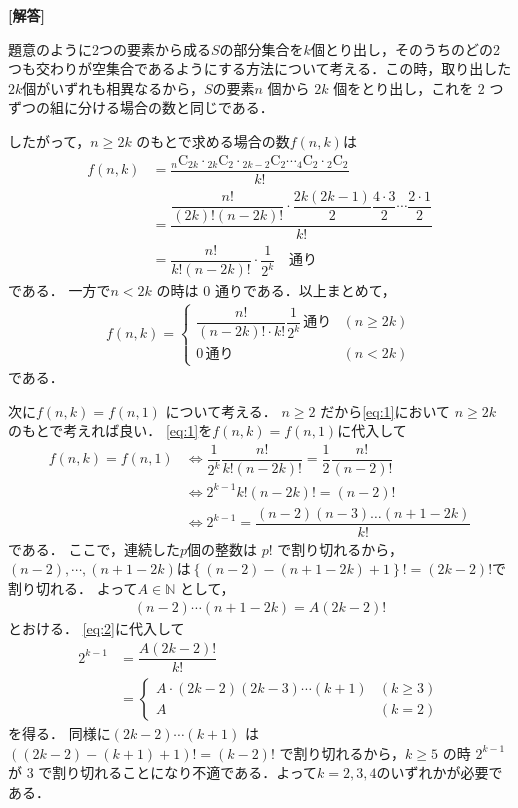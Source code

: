 \documentclass[../../main.tex]{subfiles}
\begin{document}
\begin{oframed}
  
\end{oframed}

{\bf [解答]}

題意のように2つの要素から成る$S$の部分集合を$k$個とり出し，そのうちのどの2つも交わりが空集合であるようにする方法について考える．この時，取り出した$2k$個がいずれも相異なるから，$S$の要素$n$ 個から $2k$ 個をとり出し，これを $2$ つずつの組に分ける場合の数と同じである．

したがって，$n \ge 2k$ のもとで求める場合の数$f(n,k)$は
\begin{align}
  f(n,k)
  &= \dfrac{{}_n\mathrm{C}_{2k} \cdot {}_{2k}\mathrm{C}_2 \cdot {}_{2k-2}\mathrm{C}_2 \cdots {}_4\mathrm{C}_2 \cdot {}_2\mathrm{C}_2}{k!} \\
  &= \dfrac{\dfrac{n!}{(2k)!(n-2k)!} \cdot \dfrac{2k(2k-1)}{2} \dfrac{4\cdot 3}{2} \cdots \dfrac{2\cdot 1}{2}}{k!} \\
  &= \dfrac{n!}{k!(n-2k)!} \cdot \dfrac{1}{2^k} \quad \text{通り}
\end{align}
である．
一方で$n < 2k$ の時は $0$ 通りである．以上まとめて，
\begin{align}
  f(n, k) =
  \begin{cases}
    \dfrac{n!}{(n-2k)! \cdot k!} \dfrac{1}{2^k} \, \text{通り} & (n \ge 2k) \\
    0 \, \text{通り} & (n < 2k)
  \end{cases} \label{eq:1}
\end{align}
である．

次に$f(n, k) = f(n, 1)$ について考える．
$n \ge 2$ だから\cref{eq:1}において $n \ge 2k$ のもとで考えれば良い．
\cref{eq:1}を$f(n, k) = f(n, 1)$に代入して
\begin{align}
  f(n, k) = f(n, 1)
  &\iff \dfrac{1}{2^k} \dfrac{n!}{k!(n-2k)!} = \dfrac{1}{2} \dfrac{n!}{(n-2)!} \\
  &\iff 2^{k-1} k! (n-2k)! = (n-2)! \\
  &\iff 2^{k-1} = \dfrac{(n-2)(n-3) \dots (n+1-2k)}{k!} \label{eq:2}
\end{align}
である．
ここで，連続した$p$個の整数は $p!$ で割り切れるから，
$(n-2),\cdots,(n+1-2k)$は$\left\{(n-2)-(n+1-2k)+1\right\}!=(2k-2)!$で割り切れる．
よって$A \in \mathbb{N}$ として，
\begin{align}
  (n-2) \cdots (n+1-2k) = A(2k-2)! \label{eq:3}
\end{align}
とおける．
\cref{eq:2}に代入して
\begin{align}
  2^{k-1}
  & = \dfrac{A(2k-2)!}{k!} \\
  & =
  \begin{cases}
    A \cdot (2k-2)(2k-3) \cdots (k+1)  & (k \ge 3) \\
    A & (k=2)
  \end{cases} \label{eq:4}
\end{align}
を得る．
同様に$(2k-2) \cdots (k+1)$ は $((2k-2)-(k+1)+1)!=(k-2)!$ で割り切れるから，$k \ge 5$ の時 $2^{k-1}$ が $3$ で割り切れることになり不適である．よって$k=2,3,4$のいずれかが必要である．
\end{document}
